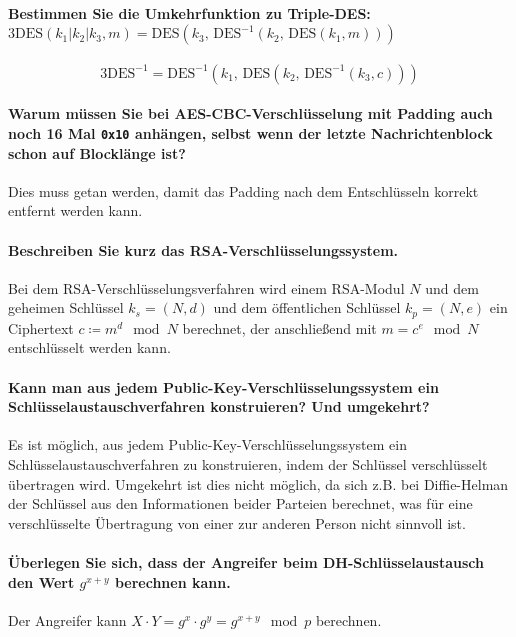 \documentclass[a4paper, 11pt, accentcolor = tud3b]{tudreport}
\begin{document}
	        \paragraph{Bestimmen Sie die Umkehrfunktion zu Triple-DES: \(\textrm{3DES}(k_1 \vert k_2 \vert k_3, m) = \textrm{DES}(k_3, \,\textrm{DES}^{-1}(k_2, \,\textrm{DES}(k_1, m)))\)}
	        \begin{equation*}
		        \textrm{3DES}^{-1} = \textrm{DES}^{-1}(k_1, \,\textrm{DES}(k_2, \,\textrm{DES}^{-1}(k_3, c)))
	        \end{equation*}
	        
	        \paragraph{Warum müssen Sie bei AES-CBC-Verschlüsselung mit Padding auch noch 16 Mal \texttt{0x10} anhängen, selbst wenn der letzte Nachrichtenblock schon auf Blocklänge ist?}
	        Dies muss getan werden, damit das Padding nach dem Entschlüsseln korrekt entfernt werden kann.
	        
	        \paragraph{Beschreiben Sie kurz das RSA-Verschlüsselungssystem.}
	        Bei dem RSA-Verschlüsselungsverfahren wird einem RSA-Modul \(N\) und dem geheimen Schlüssel \(k_s = (N, d)\) und dem öffentlichen Schlüssel \(k_p = (N, e)\) ein Ciphertext \( c \coloneqq m^d \mod N \) berechnet, der anschließend mit \( m = c^e \mod N \) entschlüsselt werden kann.
	        
	        \paragraph{Kann man aus jedem Public-Key-Verschlüsselungssystem ein Schlüsselaustauschverfahren konstruieren? Und umgekehrt?}
	        Es ist möglich, aus jedem Public-Key-Verschlüsselungssystem ein Schlüsselaustauschverfahren zu konstruieren, indem der Schlüssel verschlüsselt übertragen wird. Umgekehrt ist dies nicht möglich, da sich z.B. bei Diffie-Helman der Schlüssel aus den Informationen beider Parteien berechnet, was für eine verschlüsselte Übertragung von einer zur anderen Person nicht sinnvoll ist.
	        
	        \paragraph{Überlegen Sie sich, dass der Angreifer beim DH-Schlüsselaustausch den Wert \(g^{x + y}\) berechnen kann.}
	        Der Angreifer kann \( X \cdot Y = g ^ x \cdot g ^ y = g ^ {x+y} \mod p \) berechnen.
\end{document}
